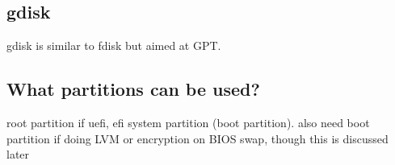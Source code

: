 \subsection{gdisk}

gdisk is similar to fdisk but aimed at GPT.

\subsection{What partitions can be used?}

root partition
if uefi, efi system partition (boot partition). also need boot partition if doing LVM or encryption on BIOS
swap, though this is discussed later


